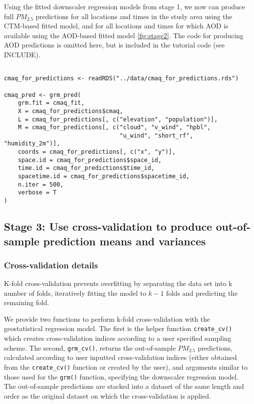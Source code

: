 \documentclass[12pt]{article}
\begin{document}
Using the fitted downscaler regression models from stage 1, we now can produce full $PM_2.5$ predictions for all locations and times in the study area using the CTM-based fitted model, and for all locations and times for which AOD is available using the AOD-based fitted model \ref{fig:stage2}.
The code for producing AOD predictions is omitted here, but is included in the tutorial code (see INCLUDE).


\begin{lstlisting}

cmaq_for_predictions <- readRDS("../data/cmaq_for_predictions.rds")

cmaq_pred <- grm_pred(
    grm.fit = cmaq_fit,
    X = cmaq_for_predictions$cmaq,
    L = cmaq_for_predictions[, c("elevation", "population")],
    M = cmaq_for_predictions[, c("cloud", "v_wind", "hpbl",
                                 "u_wind", "short_rf", "humidity_2m")],
    coords = cmaq_for_predictions[, c("x", "y")],
    space.id = cmaq_for_predictions$space_id,
    time.id = cmaq_for_predictions$time_id,
    spacetime.id = cmaq_for_predictions$spacetime_id,
    n.iter = 500,
    verbose = T
)

\end{lstlisting}



\subsection*{Stage 3: Use cross-validation to produce out-of-sample prediction means and variances}

\subsubsection*{Cross-validation details}

K-fold cross-validation prevents overfitting by separating the data set into k number of folds, iteratively fitting the model to $k-1$ folds and predicting the remaining fold.

We provide two functions to perform k-fold cross-validation with the geostatistical regression model. 
The first is the helper function \texttt{create\_cv()} which creates cross-validation indices according to a user specified sampling scheme. 
The second, \texttt{grm\_cv()}, returns the out-of-sample $PM_{2.5}$ predictions, calculated according to user inputted cross-validation indices (either obtained from the \texttt{create\_cv()} function or created by the user), and arguments similar to those used for the \texttt{grm()} function, specifying the downscaler regression model. 
The out-of-sample predictions are stacked into a dataset of the same length and order as the original dataset on which the cross-validation is applied.
\end{document}
